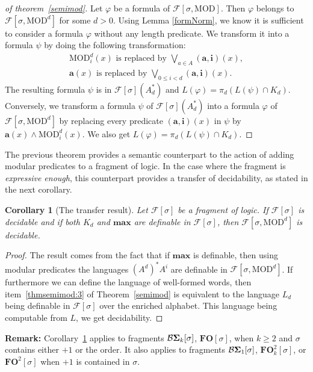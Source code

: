 \documentclass[submission,hidelink]{dmtcs-episciences}
\newtheorem{corollary}[theorem]{Corollary}
\newcommand{\WF}{K}
\renewcommand{\leq}{\leqslant}
\renewcommand{\geq}{\geqslant}
\newcommand{\cF}{\mathcal{F}}
\newcommand{\FO}{\mathbf{FO}}
\newcommand{\BS}{\mathbf{{\cal B}\Sigma}}
\newcommand{\MOD}{\mathrm{MOD}}
\newcommand{\Fsigmod}{\cF[\sigma,\MOD]}
\newcommand{\Fsig}{\cF[\sigma]}
\newcommand{\Fsigmodd}{\cF[\sigma, \MOD^d]}
\begin{document}
		\begin{proof}[of theorem~\ref{semimod}]
		Let $\varphi$ be a formula of $\Fsigmod$. Then $\varphi$ belongs to $\Fsigmodd$ for some $d>0$.
		Using Lemma \ref{formNorm}, we know it is sufficient to consider a formula
		$\varphi$ without any length predicate.
		We transform it into a formula $\psi$ by doing the following transformation:
		\begin{align*}
			 \MOD_i^d(x) \text{ is replaced by } \bigvee_{a\in A} \mathbf{(a,i)}(x),\\
			 	\mathbf a(x)\text{  is replaced by }\bigvee_{0\leq i<d} \mathbf{(a,i)}(x).
		\end{align*}
		The resulting formula
		$\psi$ is in $\Fsig(A_d^*)$ and $L(\varphi)=\pi_d(L(\psi)\cap \WF_d)$.
		Conversely, we transform a formula $\psi$ of $\Fsig(A_d^*)$ into a formula $\varphi$ of $\Fsigmodd$ by
		replacing every predicate $\mathbf{(a,i)}(x)$ in $\psi$ by $\mathbf a(x)\wedge \MOD_i^d(x)$.
		We also get $L(\varphi)=\pi_d(L(\psi)\cap \WF_d)$.
	\end{proof}

	The previous theorem provides a semantic counterpart to the action of adding modular predicates to a fragment of logic. In the case where
	the fragment is \emph{expressive enough}, this counterpart provides a transfer of decidability, as stated in the next
	corollary.
	\begin{corollary}[The transfer result]\label{Cor:transfer}
		Let $\cF[\sigma]$ be a fragment of logic. If $\cF[\sigma]$ is decidable and if both $\WF_d$ and $\textbf{max}$
		are
		definable in
		$\cF[\sigma]$, then
		$\cF[\sigma,\MOD^d]$ is decidable.
	\end{corollary}
	\begin{proof}
	The result comes from the fact that if $\textbf{max}$ is definable, then using modular predicates the languages $(A^d)^*A^i$ are definable in $\cF[\sigma,\MOD^d]$.
	If furthermore we can define the language of well-formed words, then item~\ref{thmsemimod:3} of Theorem~\ref{semimod} is equivalent to the language $L_d$ being definable in $\cF[\sigma]$ over the enriched alphabet.
	This language being computable from $L$, we get decidability.
	\end{proof}
	\textbf{Remark:} Corollary~\ref{Cor:transfer} applies to fragments $\BS_k[\sigma]$, $\FO[\sigma]$, when $k\geq 2$ and $\sigma$ contains either $+1$ or the order. It
	also applies to fragments $\BS_1[\sigma]$, $\FO^2_k[\sigma]$,  or $\FO^2[\sigma]$ when
	$+1$ is contained in $\sigma$.
\end{document}
